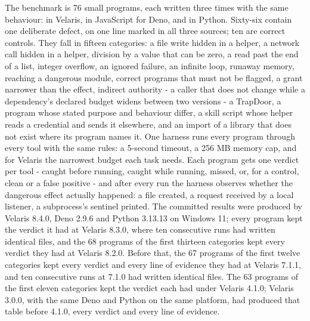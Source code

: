 \documentclass[
]{article}
\begin{document}
The benchmark is 76 small programs, each written three times with the
same behaviour: in Velaris, in JavaScript for Deno, and in Python.
Sixty-six contain one deliberate defect, on one line marked in all three
sources; ten are correct controls. They fall in fifteen categories: a
file write hidden in a helper, a network call hidden in a helper,
division by a value that can be zero, a read past the end of a list,
integer overflow, an ignored failure, an infinite loop, runaway memory,
reaching a dangerous module, correct programs that must not be flagged,
a grant narrower than the effect, indirect authority - a caller that
does not change while a dependency's declared budget widens between two
versions - a TrapDoor, a program whose stated purpose and behaviour
differ, a skill script whose helper reads a credential and sends it
elsewhere, and an import of a library that does not exist where its
program names it. One harness runs every program through every tool with
the same rules: a 5-second timeout, a 256 MB memory cap, and for Velaris
the narrowest budget each task needs. Each program gets one verdict per
tool - caught before running, caught while running, missed, or, for a
control, clean or a false positive - and after every run the harness
observes whether the dangerous effect actually happened: a file created,
a request received by a local listener, a subprocess's sentinel printed.
The committed results were produced by Velaris 8.4.0, Deno 2.9.6 and
Python 3.13.13 on Windows 11; every program kept the verdict it had at
Velaris 8.3.0, where ten consecutive runs had written identical files,
and the 68 programs of the first thirteen categories kept every verdict
they had at Velaris 8.2.0. Before that, the 67 programs of the first
twelve categories kept every verdict and every line of evidence they had
at Velaris 7.1.1, and ten consecutive runs at 7.1.0 had written
identical files. The 63 programs of the first eleven categories kept the
verdict each had under Velaris 4.1.0; Velaris 3.0.0, with the same Deno
and Python on the same platform, had produced that table before 4.1.0,
every verdict and every line of evidence.
\end{document}
